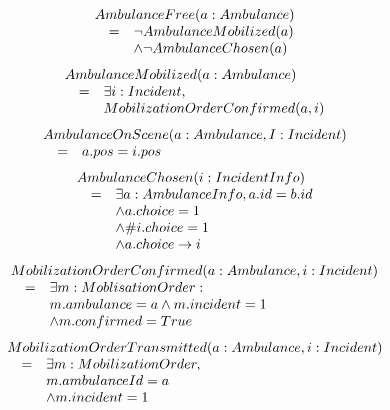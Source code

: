 \begin{equation*}
\begin{array}{rcl}
\multicolumn{3}{l}{AmbulanceFree(a: Ambulance)} \\ 
& = & \neg AmbulanceMobilized(a) \\
&   & \wedge \neg AmbulanceChosen(a) \\
\end{array}
\end{equation*}
\begin{equation*}
\begin{array}{rcl}
\multicolumn{3}{l}{AmbulanceMobilized(a: Ambulance)} \\ 
& = & \exists i:Incident, \\
&   & MobilizationOrderConfirmed(a, i) \\
\end{array}
\end{equation*}
\begin{equation*}
\begin{array}{rcl}
\multicolumn{3}{l}{AmbulanceOnScene(a:Ambulance, I:Incident)} \\ 
& = & a.pos = i.pos \\
\end{array}
\end{equation*}
\begin{equation*}
\begin{array}{rcl}
\multicolumn{3}{l}{AmbulanceChosen(i:IncidentInfo)} \\ 
& = & \exists a:AmbulanceInfo, a.id = b.id  \\
&   & \wedge a.choice = 1 \\
&   & \wedge \#i.choice = 1 \\
&   & \wedge a.choice \rightarrow i \\
\end{array}
\end{equation*}
\begin{equation*}
\begin{array}{rcl}
\multicolumn{3}{l}{MobilizationOrderConfirmed(a:Ambulance, i:Incident)} \\ 
& = & \exists m:MoblisationOrder: \\
&   & m.ambulance = a \wedge m.incident = 1 \\
&   & \wedge m.confirmed = True \\
\end{array}
\end{equation*}
\begin{equation*}
\begin{array}{rcl}
\multicolumn{3}{l}{MobilizationOrderTransmitted(a: Ambulance, i:Incident)} \\ 
& = & \exists m: MobilizationOrder, \\
&   & m.ambulanceId = a \\
&   & \wedge m.incident = 1 \\
\end{array}
\end{equation*}

